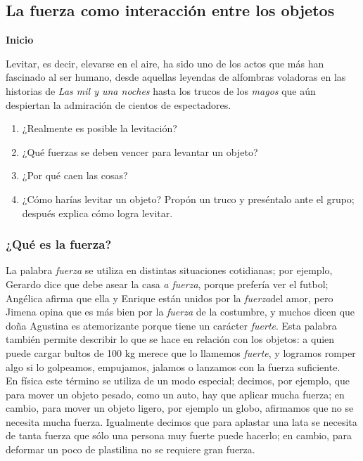 \documentclass[11pt]{book}
\begin{document}
\subsection{La fuerza como interacci\'on entre los objetos}
\begin{boxK}
    \begin{center}\textbf{\color{colorrds}Inicio}\end{center}
    Levitar, es decir, elevarse en el aire, ha sido uno de los actos que más han fascinado
    al ser humano, desde aquellas leyendas de alfombras voladoras en las historias de
    \emph{Las mil y una noches} hasta los trucos de los \emph{magos} que aún despiertan la
    admiración de cientos de espectadores.
    \begin{enumerate}
        \item ¿Realmente es posible la levitación?
        \item ¿Qué fuerzas se deben vencer para levantar un objeto?
        \item ¿Por qué caen las cosas?
        \item ¿Cómo harías levitar un objeto? Propón un truco y preséntalo ante el grupo;
              después explica cómo logra levitar.
    \end{enumerate}
\end{boxK}
\subsubsection{¿Qué es la fuerza?}
La palabra \emph{fuerza} se utiliza en distintas situaciones cotidianas; por ejemplo,
Gerardo dice que debe asear la casa \emph{a fuerza}, porque prefería ver el futbol;
Angélica afirma que ella y Enrique están unidos por la \emph{fuerza}del amor, pero
Jimena opina que es más bien por la \emph{fuerza} de la costumbre, y muchos dicen que doña Agustina
es atemorizante porque tiene un carácter \emph{fuerte}. Esta palabra también permite describir
lo que se hace en relación con los objetos: a quien puede cargar bultos de 100 kg merece
que lo llamemos \emph{fuerte}, y logramos romper algo si lo golpeamos, empujamos, jalamos o
lanzamos con la fuerza suficiente. \\

En física este término se utiliza de un modo especial;
decimos, por ejemplo, que para mover un objeto pesado, como un auto, hay que aplicar mucha
fuerza; en cambio, para mover un objeto ligero, por ejemplo un globo, afirmamos que no se
necesita mucha fuerza. Igualmente decimos que para aplastar una lata se necesita de tanta
fuerza que sólo una persona muy fuerte puede hacerlo; en cambio, para deformar un poco de
plastilina no se requiere gran fuerza.\\
\end{document}
